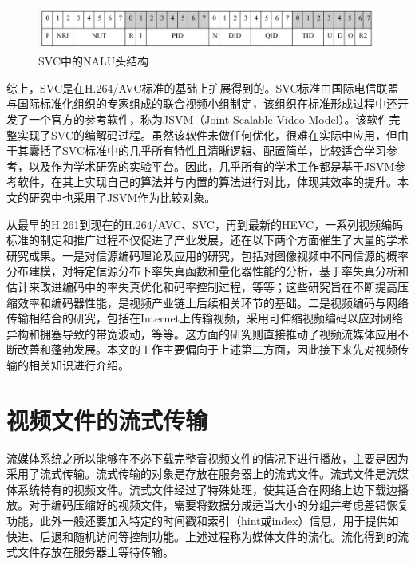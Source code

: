 \begin{figure}[h]
	\centering
	\includegraphics[width = 1.0\linewidth]{figures/svc-nalu.png}
	\caption{SVC中的NALU头结构\label{fig:svc-nalu}}
\end{figure}

综上，SVC是在H.264/AVC标准的基础上扩展得到的。SVC标准由国际电信联盟与国际标准化组织的专家组成的联合视频小组制定，该组织在标准形成过程中还开发了一个官方的参考软件，称为JSVM（Joint Scalable Video Model）\supercite{JSVM}。该软件完整实现了SVC的编解码过程。虽然该软件未做任何优化，很难在实际中应用，但由于其囊括了SVC标准中的几乎所有特性且清晰逻辑、配置简单，比较适合学习参考，以及作为学术研究的实验平台。因此，几乎所有的学术工作都是基于JSVM参考软件，在其上实现自己的算法并与内置的算法进行对比，体现其效率的提升。本文的研究中也采用了JSVM作为比较对象。

从最早的H.261到现在的H.264/AVC、SVC，再到最新的HEVC，一系列视频编码标准的制定和推广过程不仅促进了产业发展，还在以下两个方面催生了大量的学术研究成果。一是对信源编码理论及应用的研究，包括对图像视频中不同信源的概率分布建模\supercite{Birney-TIP1995, Lam-TIP2000, Sharifi-TCSVT1995, Kamaci-TCSVT2005}，对特定信源分布下率失真函数和量化器性能的分析\supercite{He-TCSVT2001, Gary-TIT1996, Gary-VCIP2005}，基于率失真分析和估计来改进编码中的率失真优化和码率控制过程\supercite{Gary-SPM1998, Lin-TCSVT1998, Sun-TCSVT2006, Lee-TCSVT2014}，等等；这些研究旨在不断提高压缩效率和编码器性能，是视频产业链上后续相关环节的基础。二是视频编码与网络传输相结合的研究\supercite{Sun-book-2001}，包括在Internet上传输视频\supercite{Wu-TCSVT2001, Conklin-TCSVT2001}，采用可伸缩视频编码以应对网络异构和拥塞导致的带宽波动\supercite{Wu-IEEE2001, Ohm-IEEE2005}，等等。这方面的研究则直接推动了视频流媒体应用不断改善和蓬勃发展。本文的工作主要偏向于上述第二方面，因此接下来先对视频传输的相关知识进行介绍。

\section{视频文件的流式传输}

流媒体系统之所以能够在不必下载完整音视频文件的情况下进行播放，主要是因为采用了流式传输。流式传输的对象是存放在服务器上的流式文件。流式文件是流媒体系统特有的视频文件。流式文件经过了特殊处理，使其适合在网络上边下载边播放。对于编码压缩好的视频文件，需要将数据分成适当大小的分组并考虑差错恢复功能，此外一般还要加入特定的时间戳和索引（hint或index）信息，用于提供如快进、后退和随机访问等控制功能。上述过程称为媒体文件的流化。流化得到的流式文件存放在服务器上等待传输。

